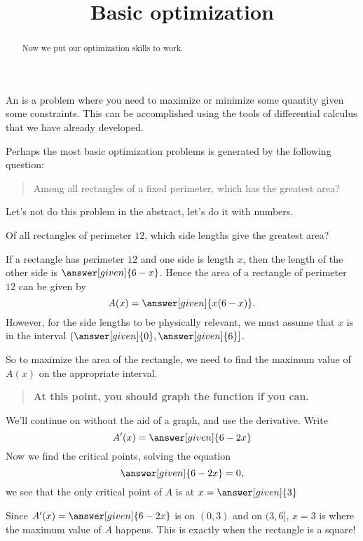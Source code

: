 \documentclass{ximera}
\title[Dig-In:]{Basic optimization}
\begin{document}
\begin{abstract}
  Now we put our optimization skills to work.
\end{abstract}
\maketitle

An  is a problem where you need to maximize
or minimize some quantity given some constraints. This can be
accomplished using the tools of differential calculus that we have
already developed.

Perhaps the most basic optimization problems is generated by the
following question:

\begin{quote}
  Among all rectangles of a fixed perimeter, which has the greatest area?
\end{quote}

Let's not do this problem in the abstract, let's do it with numbers.

\begin{example}
  Of all rectangles of perimeter $12$, which side lengths give the greatest area?
  \begin{explanation}
    If a rectangle has perimeter $12$ and one side is length $x$, then
    the length of the other side is $\answer[given]{6-x}$.
    Hence the area of a rectangle of perimeter $12$ can be given by
    \[
    A(x) = \answer[given]{x(6-x)}.
    \]
    However, for the side lengths to be physically relevant, we must
    assume that $x$ is in the interval
    $(\answer[given]{0},\answer[given]{6}]$. 
      
    So to maximize the area of the rectangle, we need to find the
    maximum value of $A(x)$ on the appropriate interval.
    \begin{quote}
      \textbf{At this point, you should graph the function if you can.}
    \end{quote}
    We'll continue on without the aid of a graph, and use the derivative. Write
    \[
    A'(x) = \answer[given]{6-2x}
    \]
    Now we find the critical points, solving the equation
    \[
    \answer[given]{6-2x} = 0,
    \]
    we see that the only critical point of $A$ is at $x=\answer[given]{3}$
    
    Since $A'(x) = \answer[given]{6-2x}$ is
     on
    $(0,3)$ and
     on
    $(3,6]$, $x=3$ is where the maximum value of $A$ happens.  This is
      exactly when the rectangle is a square!
  \end{explanation}
\end{example}
\end{document}
